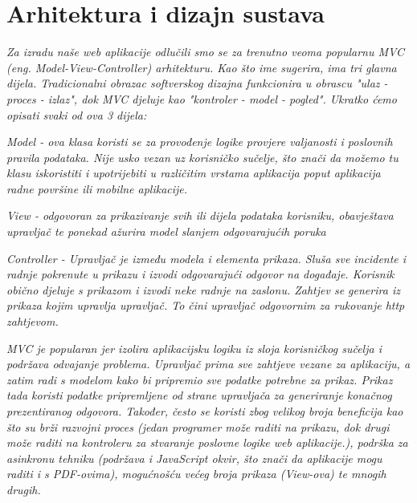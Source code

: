 \chapter{Arhitektura i dizajn sustava}


		    \textit{ Za izradu naše web aplikacije odlučili smo se za trenutno veoma popularnu MVC (eng. Model-View-Controller)  arhitekturu. Kao što ime sugerira, ima tri glavna dijela. Tradicionalni obrazac softverskog dizajna funkcionira u obrascu "ulaz - proces - izlaz", dok MVC djeluje kao "kontroler - model - pogled". Ukratko ćemo opisati svaki od ova 3 dijela: }
		
		  \begin{packed_item}
	        \item 	\textit{Model - ova klasa koristi se za provođenje logike provjere valjanosti i poslovnih pravila podataka. Nije usko vezan uz korisničko sučelje, što znači da možemo tu klasu iskoristiti i upotrijebiti u različitim vrstama aplikacija poput aplikacija radne površine ili mobilne aplikacije.    }
		    \item 	\textit{View - odgovoran za prikazivanje svih ili dijela podataka korisniku, obavještava upravljač te ponekad ažurira model slanjem odgovarajućih poruka}
		    \item 	\textit{Controller - Upravljač je između modela i elementa prikaza. Sluša sve incidente i radnje pokrenute u prikazu i izvodi odgovarajući odgovor na događaje. Korisnik obično djeluje s prikazom i izvodi neke radnje na zaslonu. Zahtjev se generira iz prikaza kojim upravlja upravljač. To čini upravljač odgovornim za rukovanje http zahtjevom.  }	
		\end{packed_item}

	        \textit {     MVC je popularan jer izolira aplikacijsku logiku iz sloja korisničkog sučelja i podržava odvajanje problema. Upravljač prima sve zahtjeve vezane za aplikaciju, a zatim radi s modelom kako bi pripremio sve podatke potrebne za prikaz. Prikaz tada koristi podatke pripremljene od strane upravljača za generiranje konačnog prezentiranog odgovora. Također, često se koristi zbog velikog broja beneficija kao što su brži razvojni proces (jedan programer može raditi na prikazu, dok drugi može raditi na kontroleru za stvaranje poslovne logike web aplikacije.), podrška za asinkronu tehniku (podržava i JavaScript okvir, što znači da aplikacije mogu raditi i s PDF-ovima), mogućnošću većeg broja prikaza (View-ova) te mnogih drugih.}
		

